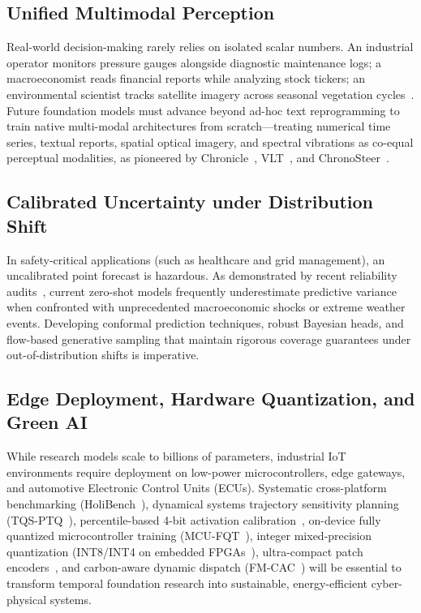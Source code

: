 \subsection{Unified Multimodal Perception}
Real-world decision-making rarely relies on isolated scalar numbers. An industrial operator monitors pressure gauges alongside diagnostic maintenance logs; a macroeconomist reads financial reports while analyzing stock tickers; an environmental scientist tracks satellite imagery across seasonal vegetation cycles~\cite{qin2025timo}. Future foundation models must advance beyond ad-hoc text reprogramming to train native multi-modal architectures from scratch—treating numerical time series, textual reports, spatial optical imagery, and spectral vibrations as co-equal perceptual modalities, as pioneered by Chronicle~\cite{quinlan2026chronicle}, VLT~\cite{wang2026vlt}, and ChronoSteer~\cite{wang2025chronosteer}.

\subsection{Calibrated Uncertainty under Distribution Shift}
In safety-critical applications (such as healthcare and grid management), an uncalibrated point forecast is hazardous. As demonstrated by recent reliability audits~\cite{li2026evaluatingreliability}, current zero-shot models frequently underestimate predictive variance when confronted with unprecedented macroeconomic shocks or extreme weather events. Developing conformal prediction techniques, robust Bayesian heads, and flow-based generative sampling that maintain rigorous coverage guarantees under out-of-distribution shifts is imperative.

\subsection{Edge Deployment, Hardware Quantization, and Green AI}
While research models scale to billions of parameters, industrial IoT environments require deployment on low-power microcontrollers, edge gateways, and automotive Electronic Control Units (ECUs). Systematic cross-platform benchmarking (HoliBench~\cite{chakrabarti2026holibench}), dynamical systems trajectory sensitivity planning (TQS-PTQ~\cite{pavlova2026tqs}), percentile-based 4-bit activation calibration~\cite{ye2026calibration}, on-device fully quantized microcontroller training (MCU-FQT~\cite{deutel2024mcutraining}), integer mixed-precision quantization (INT8/INT4 on embedded FPGAs~\cite{ling2024resource}), ultra-compact patch encoders~\cite{cheraghinia2025lightweight,birkel2025tinytsm}, and carbon-aware dynamic dispatch (FM-CAC~\cite{yang2026fmcac}) will be essential to transform temporal foundation research into sustainable, energy-efficient cyber-physical systems.

